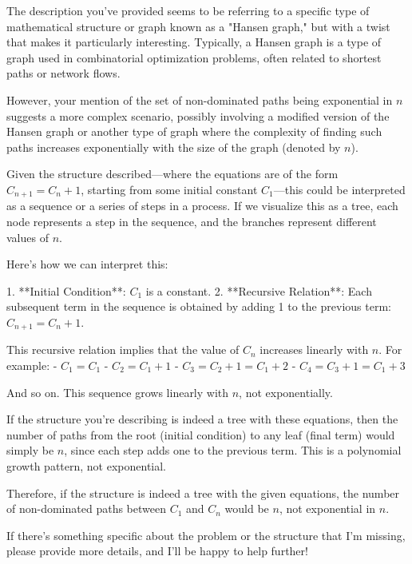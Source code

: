 The description you've provided seems to be referring to a specific type of mathematical structure or graph known as a "Hansen graph," but with a twist that makes it particularly interesting. Typically, a Hansen graph is a type of graph used in combinatorial optimization problems, often related to shortest paths or network flows.

However, your mention of the set of non-dominated paths being exponential in \( n \) suggests a more complex scenario, possibly involving a modified version of the Hansen graph or another type of graph where the complexity of finding such paths increases exponentially with the size of the graph (denoted by \( n \)).

Given the structure described—where the equations are of the form \( C_{n+1} = C_n + 1 \), starting from some initial constant \( C_1 \)—this could be interpreted as a sequence or a series of steps in a process. If we visualize this as a tree, each node represents a step in the sequence, and the branches represent different values of \( n \).

Here's how we can interpret this:

1. **Initial Condition**: \( C_1 \) is a constant.
2. **Recursive Relation**: Each subsequent term in the sequence is obtained by adding 1 to the previous term: \( C_{n+1} = C_n + 1 \).

This recursive relation implies that the value of \( C_n \) increases linearly with \( n \). For example:
- \( C_1 = C_1 \)
- \( C_2 = C_1 + 1 \)
- \( C_3 = C_2 + 1 = C_1 + 2 \)
- \( C_4 = C_3 + 1 = C_1 + 3 \)

And so on. This sequence grows linearly with \( n \), not exponentially.

If the structure you're describing is indeed a tree with these equations, then the number of paths from the root (initial condition) to any leaf (final term) would simply be \( n \), since each step adds one to the previous term. This is a polynomial growth pattern, not exponential.

Therefore, if the structure is indeed a tree with the given equations, the number of non-dominated paths between \( C_1 \) and \( C_n \) would be \( n \), not exponential in \( n \).

If there's something specific about the problem or the structure that I'm missing, please provide more details, and I'll be happy to help further!